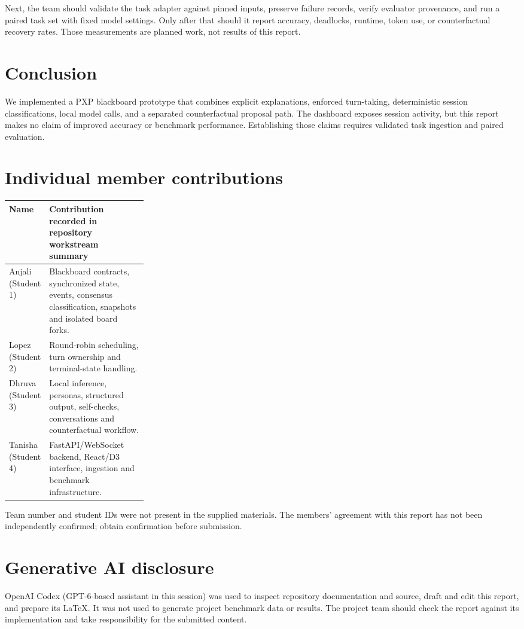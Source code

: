 \documentclass[11pt,a4paper,twocolumn]{article}
\begin{document}
Next, the team should validate the task adapter against pinned inputs, preserve failure records, verify evaluator provenance, and run a paired task set with fixed model settings. Only after that should it report accuracy, deadlocks, runtime, token use, or counterfactual recovery rates. Those measurements are planned work, not results of this report.

\section{Conclusion}
We implemented a PXP blackboard prototype that combines explicit explanations, enforced turn-taking, deterministic session classifications, local model calls, and a separated counterfactual proposal path. The dashboard exposes session activity, but this report makes no claim of improved accuracy or benchmark performance. Establishing those claims requires validated task ingestion and paired evaluation.

\section*{Individual member contributions}
{\small
\begin{tabularx}{\linewidth}{@{}p{0.27\linewidth} >{\raggedright\arraybackslash}X@{}}
\toprule
Name & Contribution recorded in repository workstream summary \\
\midrule
Anjali (Student 1) & Blackboard contracts, synchronized state, events, consensus classification, snapshots and isolated board forks. \\
Lopez (Student 2) & Round-robin scheduling, turn ownership and terminal-state handling. \\
Dhruva (Student 3) & Local inference, personas, structured output, self-checks, conversations and counterfactual workflow. \\
Tanisha (Student 4) & FastAPI/WebSocket backend, React/D3 interface, ingestion and benchmark infrastructure. \\
\bottomrule
\end{tabularx}}

\smallskip
\noindent Team number and student IDs were not present in the supplied materials. The members' agreement with this report has not been independently confirmed; obtain confirmation before submission.

\section*{Generative AI disclosure}
OpenAI Codex (GPT-6-based assistant in this session) was used to inspect repository documentation and source, draft and edit this report, and prepare its LaTeX. It was not used to generate project benchmark data or results. The project team should check the report against its implementation and take responsibility for the submitted content.
\end{document}
